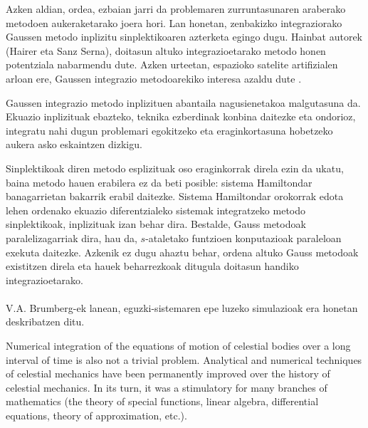 Azken aldian, ordea, ezbaian jarri da problemaren zurruntasunaren araberako metodoen aukeraketarako joera hori. Lan honetan, zenbakizko integraziorako Gaussen metodo inplizitu sinplektikoaren azterketa egingo dugu. Hainbat autorek (Hairer \cite{Hairer2006,Hairer2008} eta Sanz Serna\cite{JMSanz-Serna1994}), doitasun altuko integrazioetarako metodo honen potentziala nabarmendu dute. Azken urteetan, espazioko satelite artifizialen arloan ere, Gaussen integrazio metodoarekiko interesa azaldu dute \cite{Bradley2014,Beylkin2014}. 

Gaussen integrazio metodo inplizituen abantaila nagusienetakoa malgutasuna da. Ekuazio inplizituak ebazteko, teknika ezberdinak konbina daitezke eta ondorioz, integratu nahi dugun problemari egokitzeko eta eraginkortasuna hobetzeko aukera asko eskaintzen dizkigu.

Sinplektikoak diren metodo esplizituak oso eraginkorrak direla ezin da ukatu, baina metodo hauen erabilera ez da beti posible: sistema Hamiltondar banagarrietan bakarrik erabil daitezke. Sistema Hamiltondar orokorrak edota lehen ordenako ekuazio diferentzialeko sistemak integratzeko metodo sinplektikoak, inplizituak izan behar dira. Bestalde, Gauss metodoak paralelizagarriak dira, hau da, $s$-ataletako funtzioen konputazioak paraleloan exekuta daitezke. Azkenik ez dugu ahaztu behar, ordena altuko Gauss metodoak existitzen direla  eta hauek beharrezkoak ditugula doitasun handiko integrazioetarako.     


\paragraph*{} V.A. Brumberg-ek \cite[2012]{Brumberg2013} lanean, eguzki-sistemaren epe luzeko simulazioak era honetan deskribatzen ditu.
\begin{displayquote}
Numerical integration of the equations of motion of celestial bodies over a long interval of time is also not a trivial problem. Analytical and numerical techniques of celestial mechanics have been permanently improved over the history of celestial mechanics. In its turn, it was a stimulatory for many branches of mathematics (the theory of special functions, linear algebra, differential equations, theory of approximation, etc.).
\end{displayquote}  

